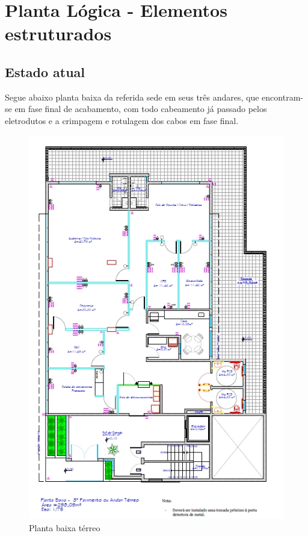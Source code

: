\documentclass[	DIV=calc,%
							paper=a4,%
							fontsize=12pt,%
							onecolumn]{scrartcl}	 					%
\begin{document}
\section{Planta Lógica - Elementos estruturados}

\subsection{Estado atual}
Segue abaixo planta baixa da referida sede em seus três andares, que encontram-se em fase final de acabamento, com todo cabeamento já passado pelos eletrodutos e a crimpagem e rotulagem dos cabos em fase final.
 
\begin{figure}
	\centering
	\includegraphics[width=\textwidth]{fig1}
	\caption{Planta baixa térreo}
	\label{fig1}
\end{figure}
\end{document}
